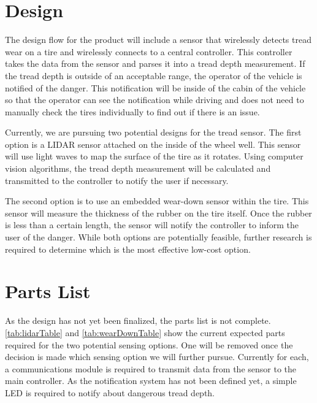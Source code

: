 \documentclass[11pt]{IEEEtran}
\begin{document}
	



	\section{Design}
		The design flow for the product will include a sensor that wirelessly detects tread wear on a tire and wirelessly connects to a central controller. This controller takes the data from the sensor and parses it into a tread depth measurement. If the tread depth is outside of an acceptable range, the operator of the vehicle is notified of the danger. This notification will be inside of the cabin of the vehicle so that the operator can see the notification while driving and does not need to manually check the tires individually to find out if there is an issue. 

		Currently, we are pursuing two potential designs for the tread sensor. The first option is a LIDAR sensor attached on the inside of the wheel well. This sensor will use light waves to map the surface of the tire as it rotates. Using computer vision algorithms, the tread depth measurement will be calculated and transmitted to the controller to notify the user if necessary.

		The second option is to use an embedded wear-down sensor within the tire. This sensor will measure the thickness of the rubber on the tire itself. Once the rubber is less than a certain length, the sensor will notify the controller to inform the user of the danger. While both options are potentially feasible, further research is required to determine which is the most effective low-cost option.

	\section{Parts List}
		As the design has not yet been finalized, the parts list is not complete. \autoref{tab:lidarTable} and \autoref{tab:wearDownTable} show the current expected parts required for the two potential sensing options. One will be removed once the decision is made which sensing option we will further pursue. Currently for each, a communications module is required to transmit data from the sensor to the main controller. As the notification system has not been defined yet, a simple LED is required to notify about dangerous tread depth. 
\end{document}
